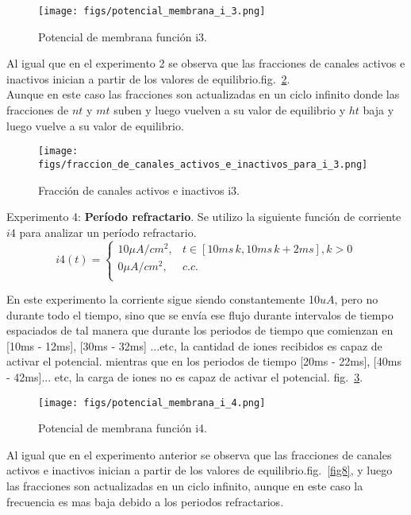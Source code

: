 \documentclass[aps,prl,twocolumn,groupedaddress]{revtex4-2}
\begin{document}
\begin{figure}[h!]
\centering
\texttt{[image: figs/potencial\_membrana\_i\_3.png]}
\caption{Potencial de membrana función i3. \label{fig5}}
\end{figure}


Al igual que en el experimento 2 se observa que las fracciones de canales activos e inactivos inician a partir de los valores de equilibrio.fig.~\ref{fig6}.\\
Aunque en este caso las fracciones son actualizadas en un ciclo infinito donde las fracciones de $nt$ y $mt$ suben y luego vuelven a su valor de equilibrio y $ht$ baja y luego vuelve a su valor de equilibrio. \\

\begin{figure}[h!]
\centering
\texttt{[image: figs/fraccion\_de\_canales\_activos\_e\_inactivos\_para\_i\_3.png]}
\caption{Fracción de canales activos e inactivos i3. \label{fig6}}
\end{figure}


Experimento 4: \textbf{Período refractario}. Se utilizo la siguiente función de corriente $i4$ para analizar un período refractario.
$$
i4(t) = \left\{
\begin{array}{ll}
10 \mu A/cm^2, & t\in [10ms\, k,10 ms\, k + 2ms], k > 0\\
0 \mu A/cm^2, & c.c. \\
\end{array}
\right.
$$

En este experimento la corriente sigue siendo constantemente 10$uA$, pero no durante todo el tiempo, sino que se envía ese flujo durante intervalos de tiempo espaciados de tal manera que durante los periodos de tiempo que comienzan en [10ms - 12ms], [30ms - 32ms] ...etc, la cantidad de iones recibidos es capaz de activar el potencial. mientras que en los periodos de tiempo [20ms - 22ms], [40ms - 42ms]... etc, la carga de iones no es capaz de activar el potencial. fig.~\ref{fig7}.


\begin{figure}[h!]
\centering
\texttt{[image: figs/potencial\_membrana\_i\_4.png]}
\caption{Potencial de membrana función i4.\label{fig7}}
\end{figure}



Al igual que en el experimento anterior se observa que las fracciones de canales activos e inactivos inician a partir de los valores de equilibrio.fig.~\ref{fig8}, y luego las fracciones son actualizadas en un ciclo infinito, aunque en este caso la frecuencia es mas baja debido a los periodos refractarios.\\
\end{document}
